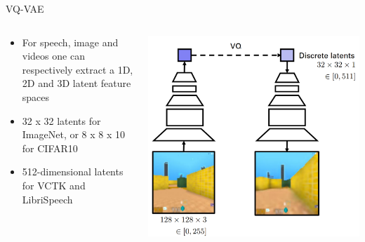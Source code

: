 \begin{frame}{VQ-VAE}
    \begin{columns}
\begin{column}{0.4\textwidth}
   \begin{itemize}
       \item For speech, image and videos one can respectively extract a 1D, 2D and 3D latent feature spaces
       \item  32 x 32 latents for ImageNet, or 8 x 8 x 10 for CIFAR10
       \item 512-dimensional latents for VCTK and LibriSpeech
   \end{itemize}
\end{column}
\begin{column}{0.6\textwidth}  %
    \begin{center}
     \includegraphics[height=0.9\textheight, width=\textwidth, keepaspectratio]{images/vae/vqvae_b.PNG}
     \end{center}
\end{column}
\end{columns}
\end{frame}

